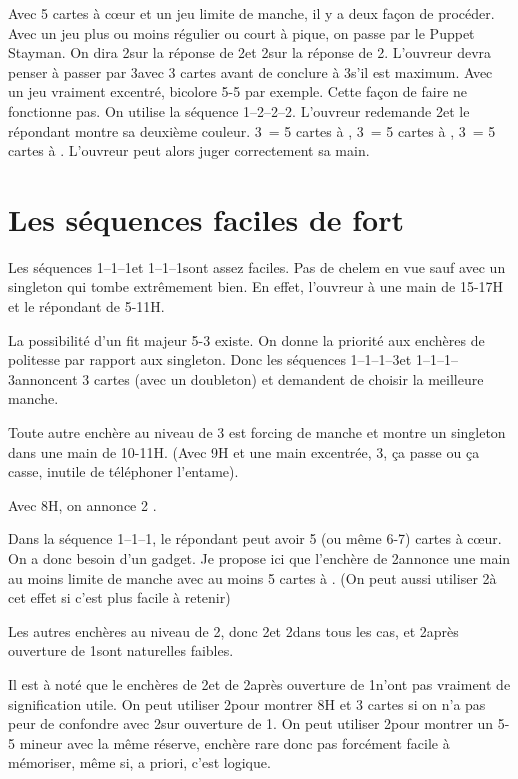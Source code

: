 \documentclass[a4paper,12pt, french]{article}
\newcommand{\T}{\Cl}
\newcommand{\K}{\Di}
\newcommand{\C}{\He}
\renewcommand{\P}{\Sp}
\begin{document}
Avec 5 cartes à cœur et un jeu limite de manche, il y a deux façon de procéder. Avec un jeu plus ou moins régulier ou court à pique, on passe par le Puppet Stayman.
On dira 2\C sur la réponse de 2\K et 2\NT sur la réponse de 2\P. L'ouvreur devra penser à passer par 3\C avec 3 cartes avant de conclure à 3\NT s'il est maximum.
Avec un jeu vraiment excentré, bicolore 5-5 par exemple. Cette façon de faire ne fonctionne pas. On utilise la séquence 1\NT--2\K--2\C--2\P. L'ouvreur redemande 2\NT et le répondant montre sa deuxième couleur. 3\T\ = 5 cartes à \T, 3\K\ = 5 cartes à \K, 3\C\ = 5 cartes à \P. L'ouvreur peut alors juger correctement sa main.

\section{Les séquences faciles de \NT fort}

Les séquences 1\T--1\K--1\NT et 1\K--1\C--1\NT sont assez faciles. Pas de chelem en vue sauf avec un singleton qui tombe extrêmement bien.
En effet, l'ouvreur à une main de 15-17H et le répondant de 5-11H.

La possibilité d'un fit majeur 5-3 existe. On donne la priorité aux enchères de politesse par rapport aux singleton. Donc les séquences 1\T--1\K--1\NT--3\C et
1\K--1\C--1\NT--3\P annoncent 3 cartes (avec un doubleton) et demandent de choisir la meilleure manche. 

Toute autre enchère au niveau de 3 est forcing de manche et montre un singleton dans une main de 10-11H. (Avec 9H et une main excentrée, 3\NT, ça passe ou ça casse, inutile de téléphoner l'entame).

Avec 8H, on annonce 2 \NT.

Dans la séquence 1\K--1\C--1\NT, le répondant peut avoir 5 (ou même 6-7) cartes à cœur. On a donc besoin d'un gadget. Je propose ici que l'enchère de 2\P annonce une main au moins limite de manche avec au moins 5 cartes à \C. (On peut aussi utiliser 2\T à cet effet si c'est plus facile à retenir)

Les autres enchères au niveau de 2, donc 2\T et 2\K dans tous les cas, et 2\C après ouverture de 1\K sont naturelles faibles.

Il est à noté que le enchères de 2\C et de 2\P après ouverture de 1\T n'ont pas vraiment de signification utile. On peut utiliser 2\C pour montrer 8H et 3 cartes si on n'a pas peur de confondre avec 2\P sur ouverture de 1\K. On peut utiliser 2\P pour montrer un 5-5 mineur avec la même réserve, enchère rare donc pas forcément facile à mémoriser, même si, a priori, c'est logique.
\end{document}

